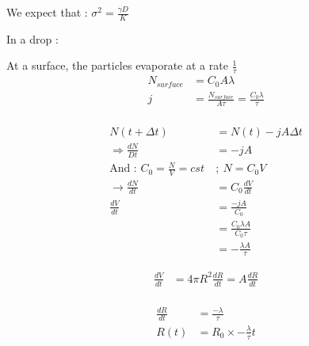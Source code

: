 \documentclass[10pt,a4paper]{article}
\begin{document}
We expect that : $ \sigma ^2 = \frac{\gamma D}{K}$


\begin{center}
    In a drop :
\end{center}

At a surface, the particles evaporate at a rate $\frac{1}{\tau}$\\

\begin{align*}
    N_{surface} &= C_0 A \lambda \\
    j &= \frac{N_{surface}}{A\tau} = \frac{C_0 \lambda}{\tau}\\
\end{align*}

\begin{align*}
    N(t + \Delta t) &= N(t) - jA\Delta t\\
    \Rightarrow \frac{dN}{Dt} &= -jA\\
    \text{And : } C_0 = \frac{N}{V} = cst ~ &;~ N=C_0V\\
    \rightarrow \frac{dN}{dt}&= C_0\frac{dV}{dt}\\
    \frac{dV}{dt} &= \frac{-jA}{C_0}\\
    &= \frac{C_0\lambda A}{C_0\tau} \\
    &= -\frac{\lambda A}{\tau}
\end{align*}

\begin{align*}
    \frac{dV}{dt} &= 4\pi R^2\frac{dR}{dt} = A\frac{dR}{dt}\\
\end{align*}

\begin{align*}
    \frac{dR}{dt}&=\frac{-\lambda}{\tau}\\
    R(t)&=R_0 \times - \frac{\lambda}{\tau}t
\end{align*}
\end{document}

